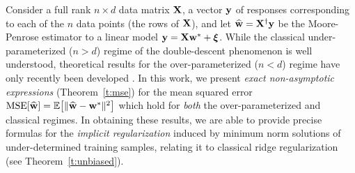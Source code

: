 \documentclass[11pt]{article}
\begin{document}
\vspace{-1cm}
Consider a full rank $n\times d$ data matrix $\mathbf X$, a vector $\mathbf y$ of
responses corresponding to each of the $n$ data points (the rows of $\mathbf X$),
and let $\widehat{\mathbf w} = \mathbf X^\dagger \mathbf y$ be the Moore-Penrose estimator to a linear
model $\mathbf y = \mathbf X \mathbf w^*+\boldsymbol\xi$.
While the classical under-parameterized ($n > d$) regime of the double-descent
phenomenon \citep{belkin2019two} is well understood, theoretical results for the over-parameterized ($n < d$) regime
have only recently been developed
\citep{belkin2019two,HMRT19_TR,Mit19_TR,MM19_TR}.
In this work,
we present \emph{exact non-asymptotic expressions} (Theorem~\ref{t:mse})
for the mean squared error $\mathrm{MSE}[\widehat{\mathbf w}]=\mathbb E\big[\|\widehat{\mathbf w}-\mathbf w^*\|^2\big]$
which hold for \emph{both} the over-parameterized and classical regimes.
In obtaining these results, we are able to provide precise formulas for the
\emph{implicit regularization} \citep{GM14_ICML,KLS18_TR,LJB19_TR}
induced by minimum norm solutions of
under-determined training samples, relating it to classical ridge
regularization (see Theorem~\ref{t:unbiased}).
\end{document}
